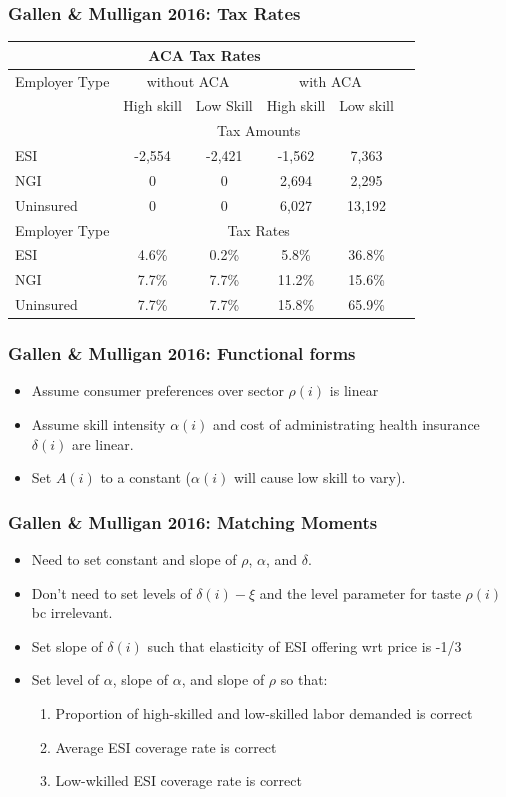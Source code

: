 \documentclass{beamer}
\begin{document}
\begin{frame}
\frametitle[alignment=center]{Gallen \& Mulligan 2016: Tax Rates}
\begin{table}
\begin{tabular}{lccccc}
 \multicolumn{5}{c}{ACA Tax Rates} \\
 \hline\hline
 Employer Type& \multicolumn{2}{c}{without ACA} & \multicolumn{2}{c}{with ACA}      \\
 \hline
  & High skill & Low Skill & High skill & Low skill    \\
  & \multicolumn{4}{c}{Tax Amounts} \\
  \cline{2-5}
 ESI & -2,554 & -2,421 & -1,562 & 7,363 \\
  NGI & 0 & 0 & 2,694 & 2,295 \\
 Uninsured & 0 & 0 & 6,027 & 13,192 \\
 \hline
  Employer Type & \multicolumn{4}{c}{Tax Rates} \\
    \cline{2-5}
 ESI & 4.6\% & 0.2\% & 5.8\% & 36.8\% \\
  NGI & 7.7\% & 7.7\% & 11.2\% & 15.6\% \\
 Uninsured & 7.7\% & 7.7\% & 15.8\% & 65.9\% \\
\end{tabular}
\end{table}
\end{frame}

\begin{frame}
\frametitle[alignment=center]{Gallen \& Mulligan 2016: Functional forms}
\begin{itemize}
\item Assume consumer preferences over sector $\rho(i)$ is linear
\item Assume skill intensity $\alpha(i)$ and cost of administrating health insurance $\delta(i)$ are linear.
\item Set $A(i)$ to a constant ($\alpha(i)$ will cause low skill to vary). 
\end{itemize}
\end{frame}

\begin{frame}
\frametitle[alignment=center]{Gallen \& Mulligan 2016: Matching Moments}
\begin{itemize}
\item Need to set constant and slope of $\rho$, $\alpha$, and $\delta$.
\item Don't need to set levels of $\delta(i)-\xi$ and the level parameter for taste $\rho(i)$ bc irrelevant.
\item Set slope of $\delta(i)$ such that elasticity of ESI offering wrt price is -1/3
\item Set level of $\alpha$, slope of $\alpha$, and slope of $\rho$ so that:
\begin{enumerate}
\item Proportion of high-skilled and low-skilled labor demanded is correct
\item Average ESI coverage rate is correct
\item Low-wkilled ESI coverage rate is correct
\end{enumerate}
 \end{itemize}
\end{frame}
\end{document}
